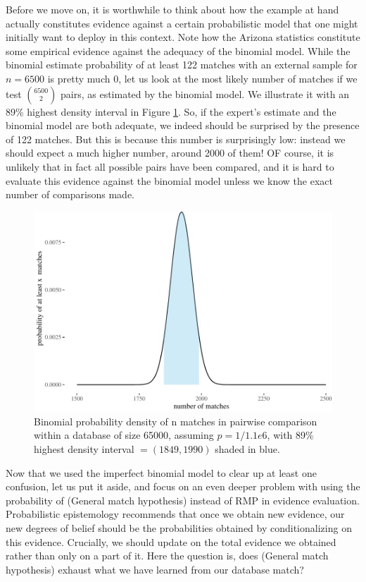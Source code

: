 \documentclass[
  10pt,
  dvipsnames,enabledeprecatedfontcommands]{scrartcl}
\begin{document}
Before we move on, it is worthwhile to think about how the example at
hand actually constitutes evidence against a certain probabilistic model
that one might initially want to deploy in this context. Note how the
Arizona statistics constitute some empirical evidence against the
adequacy of the binomial model. While the binomial estimate probability
of at least 122 matches with an external sample for \(n=6500\) is pretty
much 0, let us look at the most likely number of matches if we test
\({6500 \choose 2}\) pairs, as estimated by the binomial model. We
illustrate it with an 89\% highest density interval in Figure
\ref{fig:ArizonaDensity}. So, if the expert's estimate and the binomial
model are both adequate, we indeed should be surprised by the presence
of 122 matches. But this is because this number is surprisingly low:
instead we should expect a much higher number, around 2000 of them! OF
course, it is unlikely that in fact all possible pairs have been
compared, and it is hard to evaluate this evidence against the binomial
model unless we know the exact number of comparisons made.

\begin{figure}[h]

\begin{center}\includegraphics[width=1\linewidth]{lr-chapter4_files/figure-latex/fig:ArizonaDensity-1} \end{center}
\caption{Binomial probability density of  n matches in pairwise comparison within a database of size 65000, assuming $p=1/1.1e6$, with 89\% highest density interval $=(1849,1990)$ shaded in blue.}
\label{fig:ArizonaDensity}
\end{figure}

Now that we used the imperfect binomial model to clear up at least one
confusion, let us put it aside, and focus on an even deeper problem with
using the probability of (General match hypothesis) instead of RMP in
evidence evaluation. Probabilistic epistemology recommends that once we
obtain new evidence, our new degrees of belief should be the
probabilities obtained by conditionalizing on this evidence. Crucially,
we should update on the total evidence we obtained rather than only on a
part of it. Here the question is, does (General match hypothesis)
exhaust what we have learned from our database match?
\end{document}

